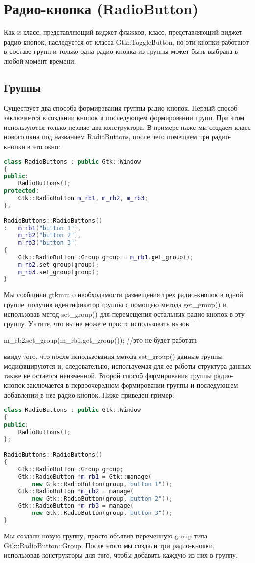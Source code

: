 \section{Радио-кнопка (RadioButton)}
Как и класс, представляющий виджет флажков, класс, представляющий виджет радио-кнопок, наследуется от класса Gtk::ToggleButton, но эти кнопки работают в составе групп и только одна радио-кнопка из группы может быть выбрана в любой момент времени. 
\subsection{Группы}
Существует два способа формирования группы радио-кнопок. Первый способ заключается в создании кнопок и последующем формировании групп. При этом используются только первые два конструктора. В примере ниже мы создаем класс нового окна под названием RadioButtons, после чего помещаем три радио-кнопки в это окно: 
\begin{lstlisting}[language=C++]
class RadioButtons : public Gtk::Window
{
public:
	RadioButtons();
protected:
	Gtk::RadioButton m_rb1, m_rb2, m_rb3;
};

RadioButtons::RadioButtons()
: 	m_rb1("button 1"),
	m_rb2("button 2"),
	m_rb3("button 3")
{
	Gtk::RadioButton::Group group = m_rb1.get_group();
	m_rb2.set_group(group);
	m_rb3.set_group(group);
}
\end{lstlisting}

 Мы сообщили gtkmm о необходимости размещения трех радио-кнопок в одной группе, получив идентификатор группы с помощью метода get\_group() и использовав метод set\_group() для перемещения остальных радио-кнопок в эту группу.
Учтите, что вы не можете просто использовать вызов

m\_rb2.set\_group(m\_rb1.get\_group()); //это не будет работать

ввиду того, что после использования метода set\_group() данные группы модифицируются и, следовательно, используемая для ее работы структура данных также не остается неизменной.
Второй способ формирования группы радио-кнопок заключается в первоочередном формировании группы и последующем добавлении в нее радио-кнопок. Ниже приведен пример: 
\begin{lstlisting}[language=C++]
class RadioButtons : public Gtk::Window
{
public:
	RadioButtons();
};

RadioButtons::RadioButtons()
{
	Gtk::RadioButton::Group group;
	Gtk::RadioButton *m_rb1 = Gtk::manage(
		new Gtk::RadioButton(group,"button 1"));
	Gtk::RadioButton *m_rb2 = manage(
		new Gtk::RadioButton(group,"button 2"));
	Gtk::RadioButton *m_rb3 = manage(
		new Gtk::RadioButton(group,"button 3"));
}
\end{lstlisting}
 Мы создали новую группу, просто объявив переменную group типа Gtk::RadioButton::Group. После этого мы создали три радио-кнопки, использовав конструкторы для того, чтобы добавить каждую из них в группу.
